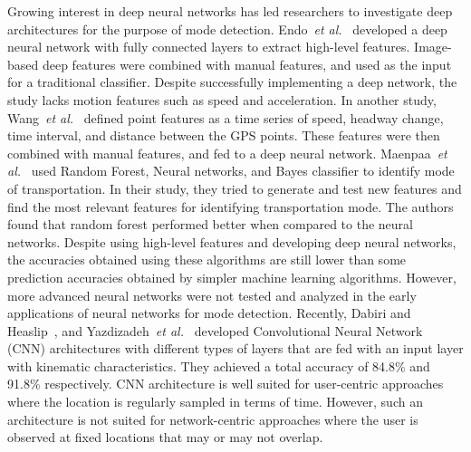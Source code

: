 Growing interest in deep neural networks has led researchers to investigate deep architectures for the purpose of mode detection. Endo~\textit{et al.}~\cite{endo2016deep} developed a deep neural network with fully connected layers to extract high-level features. Image-based deep features were combined with manual
features, and used as the input for a traditional classifier. Despite successfully implementing a deep network, the study lacks motion features such as speed and acceleration.
In another study, Wang~\textit{et al.}~\cite{wang2017detecting} defined point features as a time series of speed, headway change, time interval, and distance between the GPS points. These features were then combined with manual features, and fed to a deep neural network. Maenpaa~\textit{et al.}~\cite{maenpaa2017travel} used Random Forest, Neural networks, and Bayes classifier to identify mode of transportation. In their study, they tried to generate and test new features and find the most relevant features for identifying transportation mode. The authors found that random forest performed better when compared to the neural networks. Despite using high-level features and developing deep neural networks, the accuracies obtained using these algorithms are still lower than some prediction accuracies obtained by simpler machine learning algorithms. However, more advanced neural networks were not tested and analyzed in the early applications of neural networks for mode detection. Recently, Dabiri and Heaslip~\cite{dabiri2018inferring}, and Yazdizadeh~\textit{et al.}~\cite{yazdizadeh2019ensemble} developed Convolutional Neural Network (CNN) architectures with different types of layers that are fed with an input layer with kinematic characteristics. They achieved a total accuracy of 84.8\% and 91.8\% respectively. CNN architecture is well suited for user-centric approaches where the location is regularly sampled in terms of time. However, such an architecture is not suited for network-centric approaches where the user is observed at fixed locations that may or may not overlap. 

